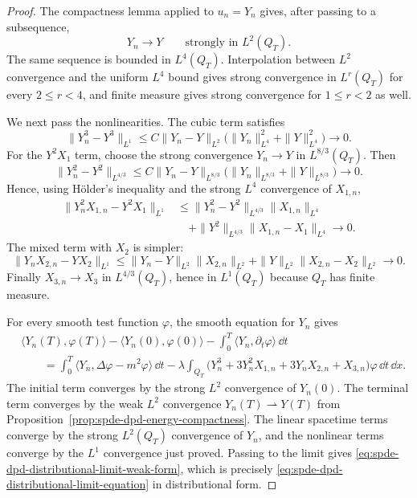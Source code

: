 \begin{proof}
The compactness lemma applied to \(u_n=Y_n\) gives, after passing to a
subsequence,
\[
  Y_n\to Y
  \qquad\text{strongly in }L^2(Q_T).
\]
The same sequence is bounded in \(L^4(Q_T)\).  Interpolation between
\(L^2\) convergence and the uniform \(L^4\) bound gives strong convergence
in \(L^r(Q_T)\) for every \(2\leq r<4\), and finite measure gives strong
convergence for \(1\leq r<2\) as well.

We next pass the nonlinearities.  The cubic term satisfies
\[
  \|Y_n^3-Y^3\|_{L^1}
  \leq
  C\|Y_n-Y\|_{L^2}
  \bigl(\|Y_n\|_{L^4}^2+\|Y\|_{L^4}^2\bigr)
  \longrightarrow0 .
\]
For the \(Y^2X_1\) term, choose the strong convergence
\(Y_n\to Y\) in \(L^{8/3}(Q_T)\).  Then
\[
  \|Y_n^2-Y^2\|_{L^{4/3}}
  \leq
  C\|Y_n-Y\|_{L^{8/3}}
  \bigl(\|Y_n\|_{L^{8/3}}+\|Y\|_{L^{8/3}}\bigr)
  \longrightarrow0 .
\]
Hence, using Hölder's inequality and the strong \(L^4\) convergence of
\(X_{1,n}\),
\[
\begin{aligned}
  \|Y_n^2X_{1,n}-Y^2X_1\|_{L^1}
  &\leq
  \|Y_n^2-Y^2\|_{L^{4/3}}\|X_{1,n}\|_{L^4}
\\
  &\quad
  +\|Y^2\|_{L^{4/3}}\|X_{1,n}-X_1\|_{L^4}
  \longrightarrow0 .
\end{aligned}
\]
The mixed term with \(X_2\) is simpler:
\[
  \|Y_nX_{2,n}-YX_2\|_{L^1}
  \leq
  \|Y_n-Y\|_{L^2}\|X_{2,n}\|_{L^2}
  +
  \|Y\|_{L^2}\|X_{2,n}-X_2\|_{L^2}
  \longrightarrow0 .
\]
Finally \(X_{3,n}\to X_3\) in \(L^{4/3}(Q_T)\), hence in \(L^1(Q_T)\)
because \(Q_T\) has finite measure.

For every smooth test function \(\varphi\), the smooth equation for \(Y_n\)
gives
\[
\begin{aligned}
  &\langle Y_n(T),\varphi(T)\rangle
  -\langle Y_n(0),\varphi(0)\rangle
  -\int_0^T\langle Y_n,\partial_t\varphi\rangle\,\dd t
\\
  &\qquad =
  \int_0^T
  \langle Y_n,\Delta\varphi-m^2\varphi\rangle\,\dd t
  -\lambda\int_{Q_T}
  \bigl(Y_n^3+3Y_n^2X_{1,n}+3Y_nX_{2,n}+X_{3,n}\bigr)
  \varphi\,\dd t\,\dd x .
\end{aligned}
\]
The initial term converges by the strong \(L^2\) convergence of \(Y_n(0)\).
The terminal term converges by the weak \(L^2\) convergence
\(Y_n(T)\rightharpoonup Y(T)\) from
Proposition~\ref{prop:spde-dpd-energy-compactness}.  The linear spacetime
terms converge by the strong \(L^2(Q_T)\) convergence of \(Y_n\), and the
nonlinear terms converge by the \(L^1\) convergence just proved.  Passing to
the limit gives
\eqref{eq:spde-dpd-distributional-limit-weak-form}, which is precisely
\eqref{eq:spde-dpd-distributional-limit-equation} in distributional form.
\end{proof}

